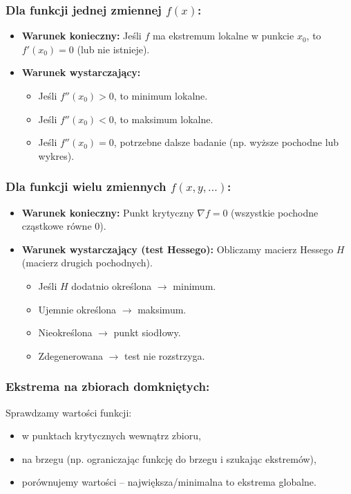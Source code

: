 \subsubsection*{Dla funkcji jednej zmiennej $f(x)$:}
\begin{itemize}
    \item \textbf{Warunek konieczny:} Jeśli $f$ ma ekstremum lokalne w punkcie $x_0$, to $f'(x_0) = 0$ (lub nie istnieje).
    \item \textbf{Warunek wystarczający:}
    \begin{itemize}
        \item Jeśli $f''(x_0) > 0$, to minimum lokalne.
        \item Jeśli $f''(x_0) < 0$, to maksimum lokalne.
        \item Jeśli $f''(x_0) = 0$, potrzebne dalsze badanie (np. wyższe pochodne lub wykres).
    \end{itemize}
\end{itemize}

\subsubsection*{Dla funkcji wielu zmiennych $f(x, y, \ldots)$:}
\begin{itemize}
    \item \textbf{Warunek konieczny:}
    Punkt krytyczny $\nabla f = 0$ (wszystkie pochodne cząstkowe równe 0).
    \item \textbf{Warunek wystarczający (test Hessego):}
    Obliczamy macierz Hessego $H$ (macierz drugich pochodnych).
    \begin{itemize}
        \item Jeśli $H$ dodatnio określona $\rightarrow$ minimum.
        \item Ujemnie określona $\rightarrow$ maksimum.
        \item Nieokreślona $\rightarrow$ punkt siodłowy.
        \item Zdegenerowana $\rightarrow$ test nie rozstrzyga.
    \end{itemize}
\end{itemize}

\subsubsection*{Ekstrema na zbiorach domkniętych:}
Sprawdzamy wartości funkcji:
\begin{itemize}
    \item w punktach krytycznych wewnątrz zbioru,
    \item na brzegu (np. ograniczając funkcję do brzegu i szukając ekstremów),
    \item porównujemy wartości -- największa/minimalna to ekstrema globalne.
\end{itemize}

